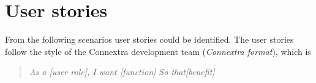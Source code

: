 \chapter{User stories}

From the following scenarios user stories could be identified. The user stories follow the style of the Connextra development team (\textit{Connextra format}), which is %
\begin{quote}
\textit{As a [user role], \newline I want [function] \newline So that[benefit]}
\end{quote} 

